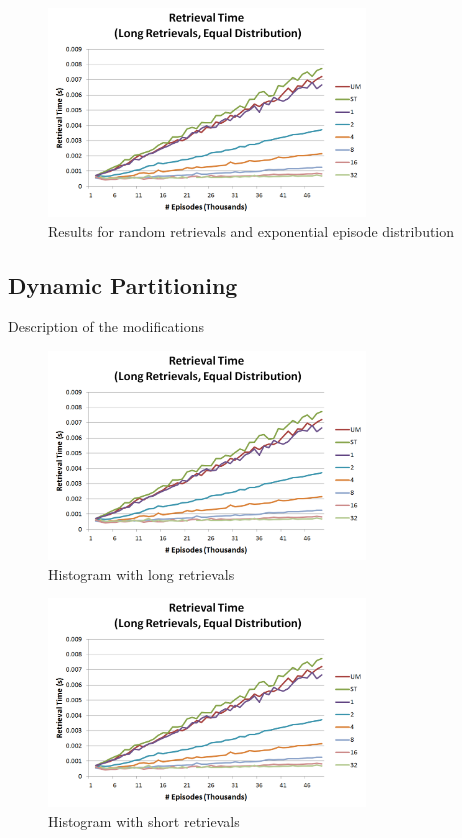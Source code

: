 \documentclass[11pt]{article} %
\begin{document}
\begin{figure}[h]
\caption{Results for random retrievals and exponential episode distribution}
\centering
\includegraphics[width=0.75\textwidth]{images/ret_worst_eq}
\end{figure}

\subsection{Dynamic Partitioning}
Description of the modifications
\begin{figure}[h]
\caption{Histogram with long retrievals}
\centering
\includegraphics[width=0.75\textwidth]{images/ret_worst_eq}
\end{figure}

\begin{figure}[h]
\caption{Histogram with short retrievals}
\centering
\includegraphics[width=0.75\textwidth]{images/ret_worst_eq}
\end{figure}
\end{document}
